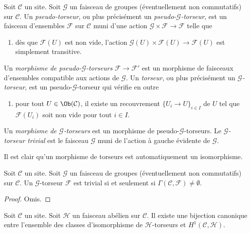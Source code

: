 \begin{definition}
\label{definition-torsor}
Soit $\mathcal{C}$ un site.
Soit $\mathcal{G}$ un faisceau de groupes (éventuellement non commutatifs)
sur $\mathcal{C}$.
Un {\it pseudo-torseur}, ou plus précisément un
{\it pseudo-$\mathcal{G}$-torseur}, est un faisceau
d'ensembles $\mathcal{F}$ sur $\mathcal{C}$ muni d'une action
$\mathcal{G} \times \mathcal{F} \to \mathcal{F}$ telle que
\begin{enumerate}
\item dès que $\mathcal{F}(U)$ est non vide, l'action
$\mathcal{G}(U) \times \mathcal{F}(U) \to \mathcal{F}(U)$
est simplement transitive.
\end{enumerate}
Un {\it morphisme de pseudo-$\mathcal{G}$-torseurs}
$\mathcal{F} \to \mathcal{F}'$
est un morphisme de faisceaux d'ensembles compatible aux
actions de $\mathcal{G}$.
Un {\it torseur}, ou plus précisément un
{\it $\mathcal{G}$-torseur}, est un pseudo-$\mathcal{G}$-torseur qui vérifie
en outre
\begin{enumerate}
\item[(2)] pour tout $U \in \Ob(\mathcal{C})$, il existe
un recouvrement $\{U_i \to U\}_{i \in I}$ de $U$
tel que $\mathcal{F}(U_i)$ soit non vide pour tout $i \in I$.
\end{enumerate}
Un {\it morphisme de $\mathcal{G}$-torseurs} est un morphisme de
pseudo-$\mathcal{G}$-torseurs.
Le {\it $\mathcal{G}$-torseur trivial}
est le faisceau $\mathcal{G}$ muni de l'action à gauche
évidente de $\mathcal{G}$.
\end{definition}

\noindent
Il est clair qu'un morphisme de torseurs est automatiquement un isomorphisme.

\begin{lemma}
\label{lemma-trivial-torsor}
Soit $\mathcal{C}$ un site.
Soit $\mathcal{G}$ un faisceau de groupes (éventuellement non commutatifs)
sur $\mathcal{C}$.
Un $\mathcal{G}$-torseur $\mathcal{F}$ est trivial si et seulement si
$\Gamma(\mathcal{C}, \mathcal{F}) \not = \emptyset$.
\end{lemma}

\begin{proof}
Omis.
\end{proof}

\begin{lemma}
\label{lemma-torsors-h1}
Soit $\mathcal{C}$ un site.
Soit $\mathcal{H}$ un faisceau abélien sur $\mathcal{C}$.
Il existe une bijection canonique entre l'ensemble des classes
d'isomorphisme de $\mathcal{H}$-torseurs et $H^1(\mathcal{C}, \mathcal{H})$.
\end{lemma}

